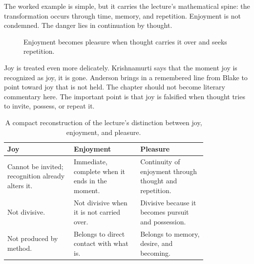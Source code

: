 The worked example is simple, but it carries the lecture's mathematical spine: the transformation occurs through time, memory, and repetition. Enjoyment is not condemned. The danger lies in continuation by thought.

\begin{figure}
\centering
{}
\caption{Enjoyment becomes pleasure when thought carries it over and seeks repetition.}
\end{figure}

Joy is treated even more delicately. Krishnamurti says that the moment joy is recognized as joy, it is gone. Anderson brings in a remembered line from Blake to point toward joy that is not held. The chapter should not become literary commentary here. The important point is that joy is falsified when thought tries to invite, possess, or repeat it.

\begin{table}
\centering
\begin{tabular}{|p{0.27\linewidth}|p{0.27\linewidth}|p{0.27\linewidth}|}
\hline
\textbf{Joy} & \textbf{Enjoyment} & \textbf{Pleasure} \\
\hline
Cannot be invited; recognition already alters it. & Immediate, complete when it ends in the moment. & Continuity of enjoyment through thought and repetition. \\
\hline
Not divisive. & Not divisive when it is not carried over. & Divisive because it becomes pursuit and possession. \\
\hline
Not produced by method. & Belongs to direct contact with what is. & Belongs to memory, desire, and becoming. \\
\hline
\end{tabular}
\caption{A compact reconstruction of the lecture's distinction between joy, enjoyment, and pleasure.}
\end{table}

